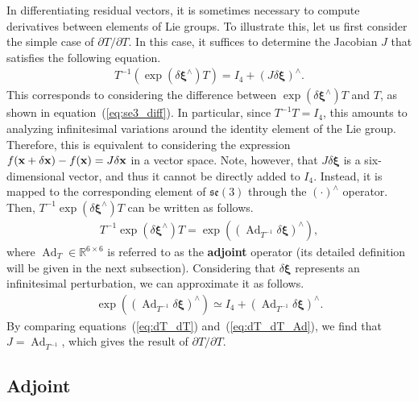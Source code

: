 In differentiating residual vectors, it is sometimes necessary to compute derivatives between elements of Lie groups.
To illustrate this, let us first consider the simple case of $\partial T / \partial T$.
In this case, it suffices to determine the Jacobian $J$ that satisfies the following equation.
%
\begin{align}
  T^{-1} \left( \exp \left( \delta \boldsymbol \xi^{\wedge} \right) T \right) = I_{4} + \left( J \delta \boldsymbol \xi \right)^{\wedge}.
  \label{eq:dT_dT}
\end{align}
%
This corresponds to considering the difference between $\exp \left( \delta \boldsymbol{\xi}^{\wedge} \right) T$ and $T$, as shown in equation~(\ref{eq:se3_diff}).
In particular, since $T^{-1} T = I_{4}$, this amounts to analyzing infinitesimal variations around the identity element of the Lie group.
Therefore, this is equivalent to considering the expression $f({\bf x} + \delta {\bf x}) - f({\bf x}) = J \delta {\bf x}$ in a vector space.
Note, however, that $J \delta \boldsymbol{\xi}$ is a six-dimensional vector, and thus it cannot be directly added to $I_{4}$.
Instead, it is mapped to the corresponding element of $\mathfrak{se}(3)$ through the $\left( \cdot \right)^{\wedge}$ operator.
Then, $T^{-1} \exp \left( \delta \boldsymbol{\xi}^{\wedge} \right) T$ can be written as follows.
%
\begin{align}
  T^{-1} \exp \left( \delta \boldsymbol \xi^{\wedge} \right) T = \exp \left( \left( \operatorname{Ad}_{T^{-1}} \delta \boldsymbol \xi \right)^{\wedge} \right),
\end{align}
%
where $\operatorname{Ad}_{T} \in \mathbb{R}^{6 \times 6}$ is referred to as the {\bf adjoint} operator (its detailed definition will be given in the next subsection).
Considering that $\delta \boldsymbol{\xi}$ represents an infinitesimal perturbation, we can approximate it as follows.
%
\begin{align}
  \exp \left( \left( \operatorname{Ad}_{T^{-1}} \delta \boldsymbol \xi \right)^{\wedge} \right) \simeq I_{4} + \left( \operatorname{Ad}_{T^{-1}} \delta \boldsymbol \xi \right)^{\wedge}.
  \label{eq:dT_dT_Ad}
\end{align}
%
By comparing equations~(\ref{eq:dT_dT}) and~(\ref{eq:dT_dT_Ad}), we find that $J = \operatorname{Ad}_{T^{-1}}$, which gives the result of $\partial T / \partial T$.







\subsection{Adjoint}

